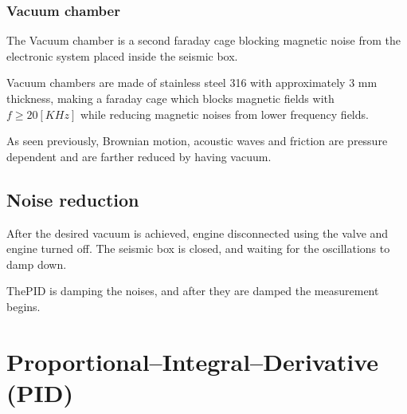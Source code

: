 \documentclass[\main/master.tex]{subfiles}
\begin{document}
\subsubsection{Vacuum chamber}
The Vacuum chamber is a second faraday cage blocking magnetic noise from the electronic system placed inside the seismic box.
\par\noindent
Vacuum chambers are made of stainless steel 316 with approximately 3 mm thickness, making a faraday cage which blocks magnetic fields with $f\ge 20 [KHz]$ while reducing magnetic noises from lower frequency fields.
\par\noindent
As seen previously, Brownian motion, acoustic waves and friction are pressure dependent and are farther reduced by having vacuum.

\subsection{Noise reduction}
\par\noindent
After the desired vacuum is achieved, engine disconnected using the valve and engine turned off. The seismic box is closed, and waiting for the oscillations to damp down.


\par\noindent
ThePID is damping the noises, and after they are damped the measurement begins.






















\section{Proportional–Integral–Derivative (PID)}
\end{document}
